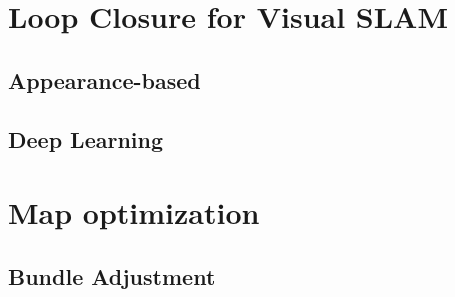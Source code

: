 %
%
%


\section{Loop Closure for Visual SLAM}

\subsection{Appearance-based}

\subsection{Deep Learning}


\section{Map optimization}

\subsection{Bundle Adjustment}



\filbreak